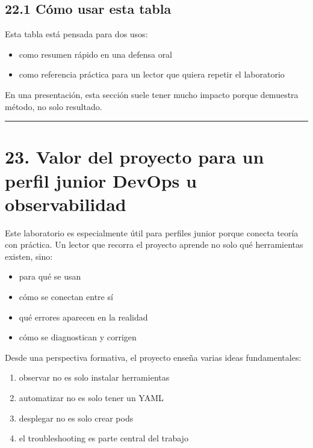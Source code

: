 \documentclass[
a4paper,
12pt]{report}
\providecommand{\tightlist}{%
  \setlength{\itemsep}{0pt}\setlength{\parskip}{0pt}}
\begin{document}
\section{22.1 Cómo usar esta tabla}\label{cuxf3mo-usar-esta-tabla}

Esta tabla está pensada para dos usos:

\begin{itemize}
\tightlist
\item
  como resumen rápido en una defensa oral
\item
  como referencia práctica para un lector que quiera repetir el
  laboratorio
\end{itemize}

En una presentación, esta sección suele tener mucho impacto porque
demuestra método, no solo resultado.

\begin{center}\rule{0.5\linewidth}{0.5pt}\end{center}

\chapter{23. Valor del proyecto para un perfil junior DevOps u
observabilidad}\label{valor-del-proyecto-para-un-perfil-junior-devops-u-observabilidad}

Este laboratorio es especialmente útil para perfiles junior porque
conecta teoría con práctica. Un lector que recorra el proyecto aprende
no solo qué herramientas existen, sino:

\begin{itemize}
\tightlist
\item
  para qué se usan
\item
  cómo se conectan entre sí
\item
  qué errores aparecen en la realidad
\item
  cómo se diagnostican y corrigen
\end{itemize}

Desde una perspectiva formativa, el proyecto enseña varias ideas
fundamentales:

\begin{enumerate}
\def\labelenumi{\arabic{enumi}.}
\tightlist
\item
  observar no es solo instalar herramientas\\
\item
  automatizar no es solo tener un YAML\\
\item
  desplegar no es solo crear pods\\
\item
  el troubleshooting es parte central del trabajo
\end{enumerate}
\end{document}
